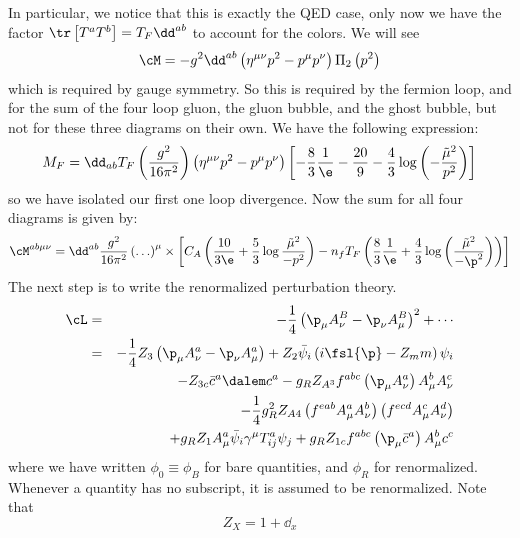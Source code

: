 \documentclass{booc}
\begin{document}
In particular, we notice that this is exactly the QED case, only now we have the factor 
$\tr\left[ T^a T^b \right] = T_F \dd^{ab}$ to account for the colors.
We will see
\begin{equation}
\cM = -g^2 \dd^{ab} \left( \eta^{\mu\nu} p^2 - p^\mu p^\nu \right)\Pi_2\left( p^2 \right)
\end{equation}
which is required by gauge symmetry. So this is required by the fermion loop, and for the sum of the 
four loop gluon, the gluon bubble, and the ghost bubble, but not for these three
diagrams on their own.
We have the following expression:
\begin{equation}
M_F = \dd_{ab}T_F \left( 
\frac{g^2}{16\pi^2}\right)\left( \eta^{\mu\nu} p^2 - p^\mu p^\nu \right)
\left[ 
-\frac{8}{3}\frac{1}{\e} - \frac{20}{9}
-\frac{4}{3} 
\log\left(-\frac{\tilde \mu^2}{p^2}\right)
\right]
\end{equation}
so we have isolated our first one loop divergence.
Now the sum for all four diagrams is given by:
\begin{equation}
\cM^{ab\mu\nu} = 
\dd^{ab} \frac{g^2}{16\pi^2} \left( \ldots \right)^\mu \times
\left[ 
C_A\left( 
\frac{10}{3\e} + \frac{5}{3} \log \frac{\tilde \mu ^2}{-p^2} 
\right)
-n_f T_F\left( 
\frac{8}{3} \frac{1}{\e} + \frac{4}{3} 
\log \left( 
\frac{\tilde \mu^2}{-\p^2} 
\right)
\right)\right]
\end{equation}
The next step is to write the renormalized perturbation theory. 
\begin{eqnarray}
\cL &=&  -\frac{1}{4} \left( \p_\mu A_\nu^B - \p_\nu A_\mu^B \right)^2 + \cdots \\
&=&  -\frac{1}{4} Z_3\left( \p_\mu A^a_\nu - \p_\nu A_\mu^a \right)
+ Z_2 \bar \psi_i \left( i\fsl{\p} - Z_m m \right)\psi_i \\
&&\qquad - Z_{3c} \bar c^a \dalem c^a - g_R Z_{A^3} f^{abc} 
\left( \p_\mu A_\nu^a \right)A_\mu^b A_\nu^c \\
&&\qquad - \frac{1}{4} g_R^2 Z_{A4}\left( f^{eab} A_\mu^a A_\nu^b \right) \left( f^{ecd}A^c_\mu A_\nu^d \right)\\
&&\qquad  + g_R Z_{1} A_\mu^a \bar \psi_i \gamma^\mu T_{ij}^a \psi_j
+ g_R Z_{1c} f^{abc} \left( \p_\mu \bar c^a \right) A_\mu^b c^c
\end{eqnarray}
where we have written
$\phi_0 \equiv \phi_B$ for bare quantities, and $\phi_R$ for renormalized.
Whenever a quantity has no subscript, it is assumed to be renormalized.
Note that
\begin{equation}
Z_X = 1 + \dd_x
\end{equation}
\end{document}
